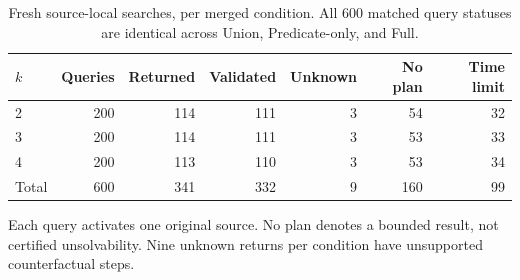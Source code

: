 \begin{table}[htbp]
\centering\small
\caption{Fresh source-local searches, per merged condition. All 600 matched query statuses are identical across Union, Predicate-only, and Full.}
\label{tab:search}
\begin{tabular}{lrrrrrr}
\toprule
$k$ & Queries & Returned & Validated & Unknown & No plan & Time limit \\
\midrule
2 & 200 & 114 & 111 & 3 & 54 & 32 \\
3 & 200 & 114 & 111 & 3 & 53 & 33 \\
4 & 200 & 113 & 110 & 3 & 53 & 34 \\
Total & 600 & 341 & 332 & 9 & 160 & 99 \\
\bottomrule
\end{tabular}
\par\smallskip\begin{minipage}{0.97\linewidth}\small Each query activates one original source. No plan denotes a bounded result, not certified unsolvability. Nine unknown returns per condition have unsupported counterfactual steps.\end{minipage}
\end{table}
